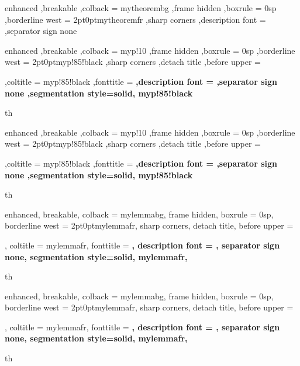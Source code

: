 {%
    enhanced
    ,breakable
    ,colback = mytheorembg
    ,frame hidden
    ,boxrule = 0sp
    ,borderline west = {2pt}{0pt}{mytheoremfr}
    ,sharp corners
    ,description font = \mdseries
    ,separator sign none
}

{%
    enhanced
    ,breakable
    ,colback = myp!10
    ,frame hidden
    ,boxrule = 0sp
    ,borderline west = {2pt}{0pt}{myp!85!black}
    ,sharp corners
    ,detach title
    ,before upper = \tcbtitle\par\smallskip
    ,coltitle = myp!85!black
    ,fonttitle = \bfseries\sffamily
    ,description font = \mdseries
    ,separator sign none
    ,segmentation style={solid, myp!85!black}
}
{th}
{%
    enhanced
    ,breakable
    ,colback = myp!10
    ,frame hidden
    ,boxrule = 0sp
    ,borderline west = {2pt}{0pt}{myp!85!black}
    ,sharp corners
    ,detach title
    ,before upper = \tcbtitle\par\smallskip
    ,coltitle = myp!85!black
    ,fonttitle = \bfseries\sffamily
    ,description font = \mdseries
    ,separator sign none
    ,segmentation style={solid, myp!85!black}
}
{th}



{%
    enhanced,
    breakable,
    colback = mylemmabg,
    frame hidden,
    boxrule = 0sp,
    borderline west = {2pt}{0pt}{mylemmafr},
    sharp corners,
    detach title,
    before upper = \tcbtitle\par\smallskip,
    coltitle = mylemmafr,
    fonttitle = \bfseries\sffamily,
    description font = \mdseries,
    separator sign none,
    segmentation style={solid, mylemmafr},
}
{th}

{%
    enhanced,
    breakable,
    colback = mylemmabg,
    frame hidden,
    boxrule = 0sp,
    borderline west = {2pt}{0pt}{mylemmafr},
    sharp corners,
    detach title,
    before upper = \tcbtitle\par\smallskip,
    coltitle = mylemmafr,
    fonttitle = \bfseries\sffamily,
    description font = \mdseries,
    separator sign none,
    segmentation style={solid, mylemmafr},
}
{th}


